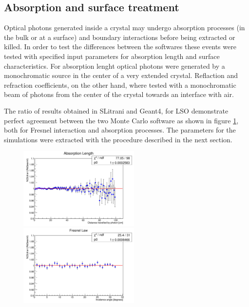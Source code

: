 \subsection{Absorption and surface treatment}
Optical photons generated inside a crystal may undergo absorption processes (in the bulk or at a surface) and boundary interactions before being extracted or killed.
In order to test the differences between the softwares these events were tested with specified input parameters for absorption length and surface characteristics.
For absorption lenght optical photons were generated by a monochromatic source in the center of a very extended crystal. Reflaction and refraction coefficients, on the other hand, where tested with a monochromatic beam of photons from the center of the crystal towards an interface with air.

The ratio of results obtained in SLitrani and Geant4, for LSO demonstrate perfect agreement between the two Monte Carlo software as shown in figure \ref{fig:abs}, both for Fresnel interaction and absorption processes. The parameters for the simulations were extracted with the procedure described in the next section.
\begin{figure}[htbp]
\begin{center}
\includegraphics[width=6cm]{../Pictures/Chapter_5/abs.png}
\includegraphics[width=6cm]{../Pictures/Chapter_5/fresnel.png}
\end{center}
\caption[]{}
\label{fig:abs}
\end{figure}

